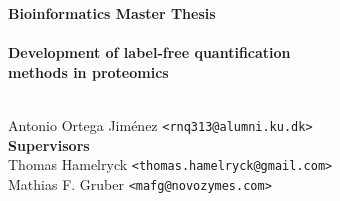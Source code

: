 \documentclass[11pt, a4paper]{report}
\begin{document}

    \thispagestyle{empty}
    \begin{adjustwidth}{-3cm}{-1.5cm}
    \vspace*{-1cm}
    \textbf{\Huge Bioinformatics Master Thesis} \\
    \vspace*{2.5cm} \\
    \textbf{\Huge Development of label-free quantification \\ methods in proteomics} \\
    \vspace*{.1cm} \\
    \begin{tabbing}
    Antonio Ortega Jiménez \hspace{1cm} \= \texttt{<rnq313@alumni.ku.dk>}
    \\[10.5cm] 
    
    \textbf{\Large Supervisors} \\
    Thomas Hamelryck \> \texttt{<thomas.hamelryck@gmail.com>} \\
    Mathias F. Gruber \> \texttt{<mafg@novozymes.com>} \\

    \end{tabbing}
    \end{adjustwidth}
    \ClearWallPaper

\setcounter{tocdepth}{2}
\tableofcontents %
\listoffigures   %
\newpage


\newpage

\let\oldthebibliography\thebibliography
\let\endoldthebibliography\endthebibliography
\renewenvironment{thebibliography}[1]{
  \begin{oldthebibliography}{#1}
    \setlength{\itemsep}{0em}
    \setlength{\parskip}{0em}
}
{
  \end{oldthebibliography}
}










\printbibliography
\end{document}
